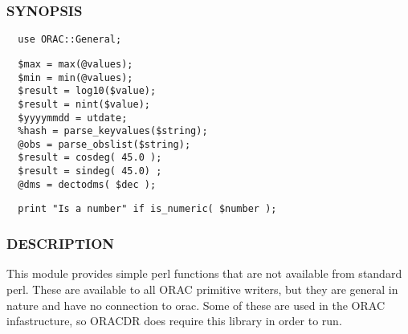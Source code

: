 \subsubsection*{SYNOPSIS\label{ORAC::General_SYNOPSIS}}
\begin{verbatim}
  use ORAC::General;
\end{verbatim}
\begin{verbatim}
  $max = max(@values);
  $min = min(@values);
  $result = log10($value);
  $result = nint($value);
  $yyyymmdd = utdate;
  %hash = parse_keyvalues($string);
  @obs = parse_obslist($string);
  $result = cosdeg( 45.0 );
  $result = sindeg( 45.0) ;
  @dms = dectodms( $dec );
\end{verbatim}
\begin{verbatim}
  print "Is a number" if is_numeric( $number );
\end{verbatim}
\subsubsection*{DESCRIPTION\label{ORAC::General_DESCRIPTION}}


This module provides simple perl functions that are not available
from standard perl. These are available to all ORAC primitive writers,
but they are general in nature and have no connection to orac. Some of
these are used in the ORAC infastructure, so ORACDR does require this
library in order to run.

